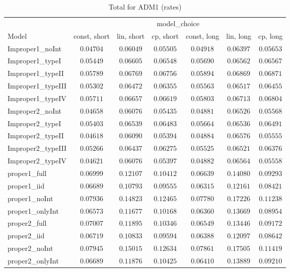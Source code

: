 \begin{table}

\caption{\label{tab:model-choice-sc11}Total for ADM1 (rates)}
\centering
\begin{tabular}{lcccccc}
\hline
 & \multicolumn{6}{c}{model_choice} \\ 
Model  & const, short & lin, short & cp, short & const, long & lin, long & \multicolumn{1}{c}{cp, long} \\ 
\hline
Improper1_noInt  & $0.04704$ & $0.06049$ & $0.05505$ & $0.04918$ & $0.06397$ & $0.05653$ \\
Improper1_typeI  & $0.05449$ & $0.06605$ & $0.06548$ & $0.05690$ & $0.06562$ & $0.06567$ \\
Improper1_typeII  & $0.05789$ & $0.06769$ & $0.06756$ & $0.05894$ & $0.06869$ & $0.06871$ \\
Improper1_typeIII  & $0.05302$ & $0.06472$ & $0.06355$ & $0.05563$ & $0.06517$ & $0.06455$ \\
Improper1_typeIV  & $0.05711$ & $0.06657$ & $0.06619$ & $0.05803$ & $0.06713$ & $0.06804$ \\
Improper2_noInt  & $0.04658$ & $0.06076$ & $0.05435$ & $0.04881$ & $0.06526$ & $0.05568$ \\
Improper2_typeI  & $0.05403$ & $0.06539$ & $0.06483$ & $0.05664$ & $0.06536$ & $0.06491$ \\
Improper2_typeII  & $0.04618$ & $0.06090$ & $0.05394$ & $0.04884$ & $0.06576$ & $0.05555$ \\
Improper2_typeIII  & $0.05266$ & $0.06437$ & $0.06275$ & $0.05525$ & $0.06521$ & $0.06376$ \\
Improper2_typeIV  & $0.04621$ & $0.06076$ & $0.05397$ & $0.04882$ & $0.06564$ & $0.05558$ \\
proper1_full  & $0.06999$ & $0.12107$ & $0.10412$ & $0.06639$ & $0.14080$ & $0.09293$ \\
proper1_iid  & $0.06689$ & $0.10793$ & $0.09555$ & $0.06315$ & $0.12161$ & $0.08421$ \\
proper1_noInt  & $0.07936$ & $0.14823$ & $0.12465$ & $0.07780$ & $0.17226$ & $0.11238$ \\
proper1_onlyInt  & $0.06573$ & $0.11677$ & $0.10168$ & $0.06360$ & $0.13669$ & $0.08954$ \\
proper2_full  & $0.07007$ & $0.11895$ & $0.10346$ & $0.06549$ & $0.13446$ & $0.09172$ \\
proper2_iid  & $0.06719$ & $0.10833$ & $0.09594$ & $0.06388$ & $0.12097$ & $0.08642$ \\
proper2_noInt  & $0.07945$ & $0.15015$ & $0.12634$ & $0.07861$ & $0.17505$ & $0.11419$ \\
proper2_onlyInt  & $0.06689$ & $0.11876$ & $0.10425$ & $0.06410$ & $0.13889$ & $0.09210$ \\
\hline 
\end{tabular}


\end{table}